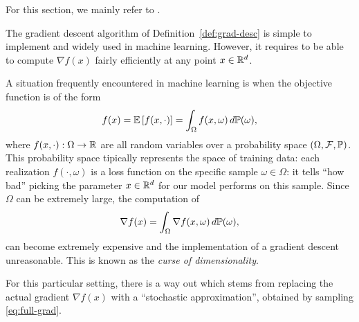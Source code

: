 \documentclass{report}
\begin{document}
For this section, we mainly refer to \cite{royerLecture}.

The gradient descent algorithm of Definition~\ref{def:grad-desc} is simple to implement and widely used in machine learning. However, it requires to be able to compute $\nabla f(x)$ fairly efficiently at any point $x\in\mathbb{R}^d$.

A situation frequently encountered in machine learning is when the objective function is of the form 
\begin{equation}
	\label{eq:loss}
	f(x) = \mathbb{E} \left[f(x,\cdot)\right] = \int_\Omega f(x,\omega)\, d\mathbb{P}(\omega),
\end{equation}
where $f(x,\cdot):\Omega\to \mathbb{R}$ are all random variables over a probability space $(\Omega,\mathcal{F}, \mathbb{P})$.
This probability space tipically represents the space of training data: each realization $f(\cdot,\omega)$ is a loss function on the specific sample $\omega\in \Omega$: it tells ``how bad'' picking the parameter $x\in\mathbb{R}^d$ for our model performs on this sample. 
Since $\Omega$ can be extremely large,  the computation of
\begin{equation}
	\label{eq:full-grad}
	\nabla f(x) = \int_{\Omega} \nabla f(x,\omega) \, d\mathbb{P}(\omega),
\end{equation}
can become extremely expensive and the implementation of a gradient descent unreasonable.
This is known as the \emph{curse of dimensionality}.


For this particular setting, there is a way out which stems from replacing the actual gradient $\nabla f(x)$ with a ``stochastic approximation'', obtained by sampling \eqref{eq:full-grad}.
\end{document}
